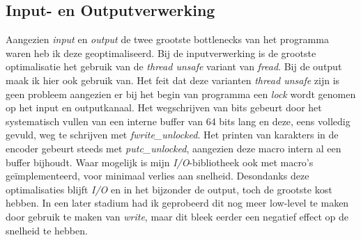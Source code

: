 \subsection{Input- en Outputverwerking}
Aangezien \emph{input} en \emph{output} de twee grootste bottlenecks van het programma waren heb ik deze geoptimaliseerd. Bij de inputverwerking is de grootste optimalisatie het gebruik van de \emph{thread unsafe} variant van \emph{fread}. Bij de output maak ik hier ook gebruik van. Het feit dat deze varianten \emph{thread unsafe} zijn is geen probleem aangezien er bij het begin van programma een \emph{lock} wordt genomen op het input en outputkanaal. Het wegschrijven van bits gebeurt door het systematisch vullen van een interne buffer van 64 bits lang en deze, eens volledig gevuld, weg te schrijven met \emph{fwrite\_unlocked}. Het printen van karakters in de encoder gebeurt steeds met \emph{putc\_unlocked}, aangezien deze macro intern al een buffer bijhoudt. Waar mogelijk is mijn \emph{I/O}-bibliotheek ook met macro's ge\"implementeerd, voor minimaal verlies aan snelheid. Desondanks deze optimalisaties blijft \emph{I/O} en in het bijzonder de output, toch de grootste kost hebben. In een later stadium had ik geprobeerd dit nog meer low-level te maken door gebruik te maken van \emph{write}, maar dit bleek eerder een negatief effect op de snelheid te hebben.
